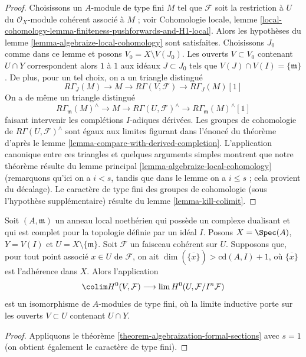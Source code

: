 \begin{proof}
Choisissons un $A$-module de type fini $M$ tel que $\mathcal{F}$ soit la
restriction à $U$ du
$\mathcal{O}_X$-module cohérent associé à $M$ ; voir Cohomologie locale,
lemme \ref{local-cohomology-lemma-finiteness-pushforwards-and-H1-local}.
Alors les hypothèses du
lemme \ref{lemma-algebraize-local-cohomology}
sont satisfaites.
Choisissons $J_0$ comme dans ce lemme et posons $V_0 = X \setminus V(J_0)$.
Les ouverts $V \subset V_0$ contenant $U \cap Y$
correspondent alors $1$ à $1$ aux idéaux $J \subset J_0$ tels que
$V(J) \cap V(I) = \{\mathfrak m\}$.
De plus, pour un tel choix, on a un triangle distingué
$$
R\Gamma_J(M) \to M \to R\Gamma(V, \mathcal{F}) \to
R\Gamma_J(M)[1]
$$
On a de même un triangle distingué
$$
R\Gamma_\mathfrak m(M)^\wedge \to
M \to
R\Gamma(U, \mathcal{F})^\wedge \to
R\Gamma_\mathfrak m(M)^\wedge[1]
$$
faisant intervenir les complétions $I$-adiques dérivées.
Les groupes de cohomologie de $R\Gamma(U, \mathcal{F})^\wedge$ sont
égaux aux limites figurant dans l'énoncé du théorème d'après le
lemme \ref{lemma-compare-with-derived-completion}.
L'application canonique entre ces triangles
et quelques arguments simples montrent que notre
théorème résulte du lemme principal \ref{lemma-algebraize-local-cohomology}
(remarquons qu'ici on a $i < s$, tandis que dans le lemme on a
$i \leq s$ ; cela provient du décalage).
Le caractère de type fini des groupes de cohomologie
(sous l'hypothèse supplémentaire) résulte du
lemme \ref{lemma-kill-colimit}.
\end{proof}

\begin{lemma}
\label{lemma-application-theorem}
Soit $(A, \mathfrak m)$ un anneau local noethérien qui possède un
complexe dualisant et qui est complet pour la topologie définie par un idéal $I$.
Posons $X = \Spec(A)$, $Y = V(I)$ et $U = X \setminus \{\mathfrak m\}$.
Soit $\mathcal{F}$ un faisceau cohérent sur $U$.
Supposons que, pour tout point associé $x \in U$ de $\mathcal{F}$,
on ait $\dim(\overline{\{x\}}) > \text{cd}(A, I) + 1$,
où $\overline{\{x\}}$ est l'adhérence dans $X$.
Alors l'application
$$
\colim H^0(V, \mathcal{F})
\longrightarrow
\lim H^0(U, \mathcal{F}/I^n\mathcal{F})
$$
est un isomorphisme de $A$-modules de type fini,
où la limite inductive porte sur les ouverts $V \subset U$
contenant $U \cap Y$.
\end{lemma}

\begin{proof}
Appliquons le théorème \ref{theorem-algebraization-formal-sections} avec $s = 1$
(on obtient également le caractère de type fini).
\end{proof}




